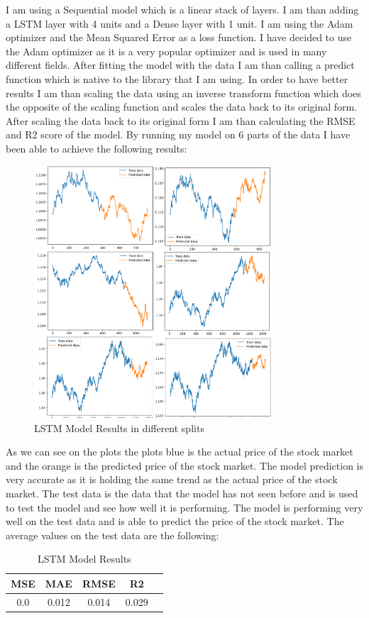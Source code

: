 \documentclass{imc-inf}
\begin{document}
	I am using a Sequential model which is a linear stack of layers. I am than adding a LSTM
	layer with 4 units and a Dense layer with 1 unit. I am using the Adam optimizer and the Mean Squared Error as a loss function.
	I have decided to use the Adam optimizer as it is a very popular optimizer and is used in many different fields. After fitting the model with the data I am than calling a predict function which is native to the library 
	that I am using. In order to have better results I am than scaling the data using an inverse transform function which does the opposite of the scaling function and scales the data back to its original form. 
	After scaling the data back to its original form I am than calculating the RMSE and R2 score of the model. 
	By running my model on 6 parts of the data I have been able to achieve the following results:			
	\begin{figure}
		\centering
		\includegraphics[width=0.8\textwidth]{lstm_chart.png}
		\caption{LSTM Model Results in different splits}
		\label{fig:lstm_model_plots}
	\end{figure}
	As we can see on the plots the plots blue is the actual price of the stock market and the orange is the predicted price of the stock market. The model prediction is very accurate as it is holding the same trend as the actual price
	of the stock market. The test data is the data that the model has not seen before and is used to test the model and see how well it is performing. The model is performing very well on the test data and is able to predict the price of the stock market.
	The average values on the test data are the following: 
	\begin{table}[h!]
		\centering
		\begin{tabular}{|c|c|c|c|c|}
			\hline
			\textbf{MSE} & \textbf{MAE} & \textbf{RMSE}  & \textbf{R2}\\ \hline
			0.0 & 0.012 & 0.014 & 0.029\\ \hline
			
			
		\end{tabular}
		\caption{LSTM Model Results}
		\label{tab:lstm_model_results}
		
	\end{table}
	
\end{document}
